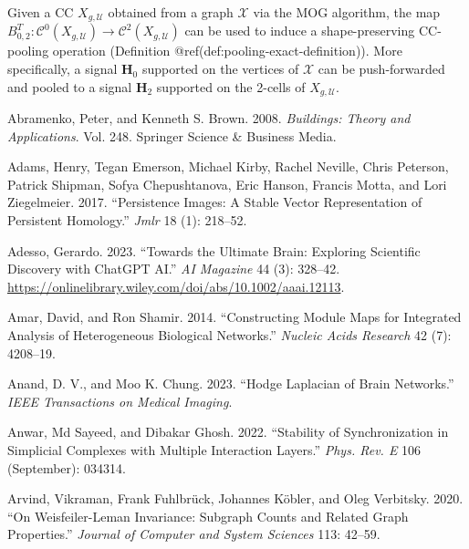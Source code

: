 \documentclass[
  12pt,
]{krantz}
\newlength{\cslhangindent}
\newenvironment{CSLReferences}[2] %
 {\begin{list}{}{%
  \setlength{\itemindent}{0pt}
  \setlength{\leftmargin}{0pt}
  \setlength{\parsep}{0pt}
  \ifodd #1
   \setlength{\leftmargin}{\cslhangindent}
   \setlength{\itemindent}{-1\cslhangindent}
  \fi
  \setlength{\itemsep}{#2\baselineskip}}}
 {\end{list}}
\begin{document}
Given a CC \(X_{g,\mathcal{U}}\) obtained from a graph \(\mathcal{X}\)
via the MOG algorithm, the map
\(B_{0,2}^T\colon\mathcal{C}^0(X_{g,\mathcal{U}})\to \mathcal{C}^2(X_{g,\mathcal{U}})\)
can be used to induce a shape-preserving CC-pooling operation
(Definition @ref(def:pooling-exact-definition)). More specifically, a
signal \(\mathbf{H}_0\) supported on the vertices of \(\mathcal{X}\) can
be push-forwarded and pooled to a signal \(\mathbf{H}_2\) supported on
the 2-cells of \(X_{g,\mathcal{U}}\).

\label{refs}
\begin{CSLReferences}{1}{0}
Abramenko, Peter, and Kenneth S. Brown. 2008. \emph{Buildings: Theory
and Applications}. Vol. 248. Springer Science \& Business Media.

Adams, Henry, Tegan Emerson, Michael Kirby, Rachel Neville, Chris
Peterson, Patrick Shipman, Sofya Chepushtanova, Eric Hanson, Francis
Motta, and Lori Ziegelmeier. 2017. {``Persistence Images: A Stable
Vector Representation of Persistent Homology.''} \emph{Jmlr} 18 (1):
218--52.

Adesso, Gerardo. 2023. {``Towards the Ultimate Brain: Exploring
Scientific Discovery with {C}hat{GPT} {AI}.''} \emph{AI Magazine} 44
(3): 328--42.
\url{https://onlinelibrary.wiley.com/doi/abs/10.1002/aaai.12113}.

Amar, David, and Ron Shamir. 2014. {``Constructing Module Maps for
Integrated Analysis of Heterogeneous Biological Networks.''}
\emph{Nucleic Acids Research} 42 (7): 4208--19.

Anand, D. V., and Moo K. Chung. 2023. {``Hodge {L}aplacian of Brain
Networks.''} \emph{IEEE Transactions on Medical Imaging}.

Anwar, Md Sayeed, and Dibakar Ghosh. 2022. {``Stability of
Synchronization in Simplicial Complexes with Multiple Interaction
Layers.''} \emph{Phys. Rev. E} 106 (September): 034314.

Arvind, Vikraman, Frank Fuhlbrück, Johannes Köbler, and Oleg Verbitsky.
2020. {``On {W}eisfeiler-{L}eman Invariance: Subgraph Counts and Related
Graph Properties.''} \emph{Journal of Computer and System Sciences} 113:
42--59.


\end{CSLReferences}
\end{document}
